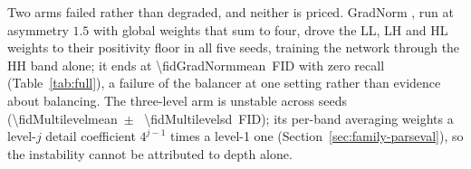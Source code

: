 Two arms failed rather than degraded, and neither is priced. GradNorm
\citep{chen2018gradnorm}, run at asymmetry $1.5$ with global weights that sum
to four, drove the LL, LH and HL weights to their positivity floor in all five
seeds, training the network through the HH band alone; it ends at
\num[round-mode=places,round-precision=1]{\fidGradNormmean}~FID with zero
recall (Table~\ref{tab:full}), a failure of the balancer at one setting
rather than evidence about balancing. The three-level arm is unstable across
seeds (\num[round-mode=places,round-precision=1]{\fidMultilevelmean}~$\pm$~%
\num[round-mode=places,round-precision=1]{\fidMultilevelsd}~FID); its
per-band averaging weights a level-$j$ detail coefficient $4^{j-1}$ times a
level-1 one (Section~\ref{sec:family-parseval}), so the instability cannot be
attributed to depth alone.



\FloatBarrier
